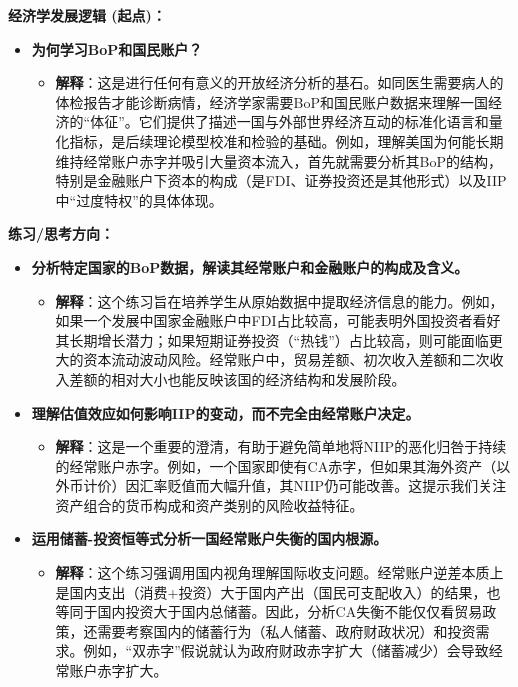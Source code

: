 \documentclass[12pt]{article}
\begin{document}
\textbf{经济学发展逻辑 (起点)：}
\begin{itemize}
    \item \textbf{为何学习BoP和国民账户？}
    \begin{itemize}
        \item \textbf{解释}：这是进行任何有意义的开放经济分析的基石。如同医生需要病人的体检报告才能诊断病情，经济学家需要BoP和国民账户数据来理解一国经济的“体征”。它们提供了描述一国与外部世界经济互动的标准化语言和量化指标，是后续理论模型校准和检验的基础。例如，理解美国为何能长期维持经常账户赤字并吸引大量资本流入，首先就需要分析其BoP的结构，特别是金融账户下资本的构成（是FDI、证券投资还是其他形式）以及IIP中“过度特权”的具体体现。
    \end{itemize}
\end{itemize}

\textbf{练习/思考方向：}
\begin{itemize}
    \item \textbf{分析特定国家的BoP数据，解读其经常账户和金融账户的构成及含义。}
    \begin{itemize}
        \item \textbf{解释}：这个练习旨在培养学生从原始数据中提取经济信息的能力。例如，如果一个发展中国家金融账户中FDI占比较高，可能表明外国投资者看好其长期增长潜力；如果短期证券投资（“热钱”）占比较高，则可能面临更大的资本流动波动风险。经常账户中，贸易差额、初次收入差额和二次收入差额的相对大小也能反映该国的经济结构和发展阶段。
    \end{itemize}
    \item \textbf{理解估值效应如何影响IIP的变动，而不完全由经常账户决定。} 
    \begin{itemize}
        \item \textbf{解释}：这是一个重要的澄清，有助于避免简单地将NIIP的恶化归咎于持续的经常账户赤字。例如，一个国家即使有CA赤字，但如果其海外资产（以外币计价）因汇率贬值而大幅升值，其NIIP仍可能改善。这提示我们关注资产组合的货币构成和资产类别的风险收益特征。
    \end{itemize}
    \item \textbf{运用储蓄-投资恒等式分析一国经常账户失衡的国内根源。} 
    \begin{itemize}
        \item \textbf{解释}：这个练习强调用国内视角理解国际收支问题。经常账户逆差本质上是国内支出（消费+投资）大于国内产出（国民可支配收入）的结果，也等同于国内投资大于国内总储蓄。因此，分析CA失衡不能仅仅看贸易政策，还需要考察国内的储蓄行为（私人储蓄、政府财政状况）和投资需求。例如，“双赤字”假说就认为政府财政赤字扩大（储蓄减少）会导致经常账户赤字扩大。
    \end{itemize}
\end{itemize}
\end{document}
